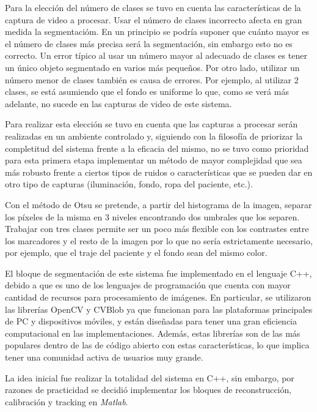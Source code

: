 Para la elección del número de clases se tuvo en cuenta las características de la captura de video a procesar. Usar el número de clases incorrecto afecta en gran medida la segmentacióm. En un principio se podría suponer que cuánto mayor es el número de clases más precisa será la segmentación, sin embargo esto no es correcto. Un error típico al usar un número mayor al adecuado de clases es tener un único objeto segmentado en varios más pequeños. Por otro lado, utilizar un número menor de clases también es causa de errores. Por ejemplo, al utilizar 2 clases, se está asumiendo que el fondo es uniforme lo que, como se verá más adelante, no sucede en las capturas de video de este sistema.

Para realizar esta elección se tuvo en cuenta que las capturas a procesar serán realizadas en un ambiente controlado y, siguiendo con la filosofía de priorizar la completitud del sistema frente a la eficacia del mismo, no se tuvo como prioridad para esta primera etapa implementar un método de mayor complejidad que sea más robusto frente a ciertos tipos de ruidos o características que se pueden dar en otro tipo de capturas (iluminación, fondo, ropa del paciente, etc.). 

Con el método de Otsu \cite{otsu} se pretende, a partir del histograma de la imagen, separar los píxeles de la misma en 3 niveles encontrando dos umbrales que los separen. Trabajar con tres clases permite ser un poco más flexible con los contrastes entre los marcadores y el resto de la imagen por lo que no sería estrictamente necesario, por ejemplo, que el traje del paciente y el fondo sean del mismo color.

El bloque de segmentación de este sistema fue implementado en el lenguaje C++, debido a que es uno de los lenguajes de programación que cuenta con mayor cantidad de recursos para procesamiento de imágenes. En particular, se utilizaron las librerías OpenCV \cite{opencv} y CVBlob \cite{cvblob} ya que funcionan para las plataformas principales de PC y dispositivos móviles, y están diseñadas para tener una gran eficiencia computacional en las implementaciones. Además, estas librerías son de las más populares dentro de las de código abierto con estas características, lo que implica tener una comunidad activa de usuarios muy grande.

La idea inicial fue realizar la totalidad del sistema en C++, sin embargo, por razones de practicidad se decidió implementar los bloques de reconstrucción, calibración y tracking en \emph{Matlab}.

